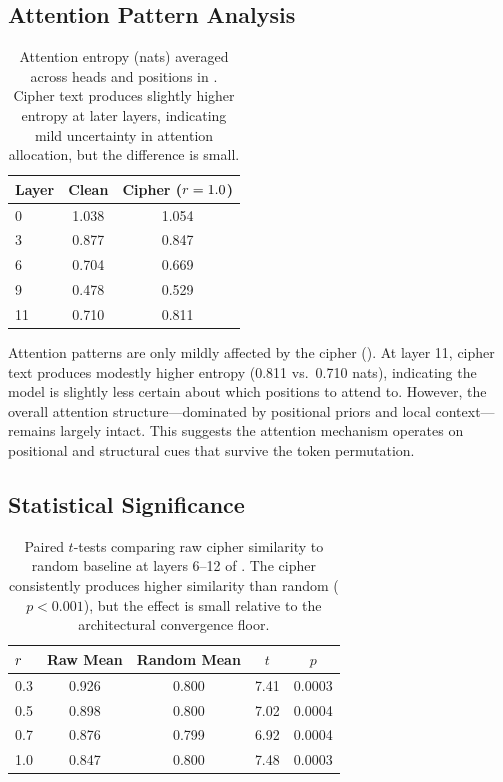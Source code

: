 \subsection{Attention Pattern Analysis}
\label{sec:attention}

\begin{table}[t]
    \centering
    \caption{Attention entropy (nats) averaged across heads and positions in \gpttwo. Cipher text produces slightly higher entropy at later layers, indicating mild uncertainty in attention allocation, but the difference is small.}
    \label{tab:attention}
    \begin{tabular}{@{}lcc@{}}
        \toprule
        Layer & Clean & Cipher ($r = 1.0$) \\
        \midrule
        0  & 1.038 & 1.054 \\
        3  & 0.877 & 0.847 \\
        6  & 0.704 & 0.669 \\
        9  & 0.478 & 0.529 \\
        11 & 0.710 & 0.811 \\
        \bottomrule
    \end{tabular}
\end{table}

Attention patterns are only mildly affected by the cipher (). At layer 11, cipher text produces modestly higher entropy (0.811 vs.\ 0.710 nats), indicating the model is slightly less certain about which positions to attend to. However, the overall attention structure---dominated by positional priors and local context---remains largely intact. This suggests the attention mechanism operates on positional and structural cues that survive the token permutation.

\subsection{Statistical Significance}
\label{sec:stats}

\begin{table}[t]
    \centering
    \caption{Paired $t$-tests comparing raw cipher similarity to random baseline at layers 6--12 of \gpttwo. The cipher consistently produces higher similarity than random ($p < 0.001$), but the effect is small relative to the architectural convergence floor.}
    \label{tab:stats}
    \begin{tabular}{@{}lcccc@{}}
        \toprule
        $r$ & Raw Mean & Random Mean & $t$ & $p$ \\
        \midrule
        0.3 & 0.926 & 0.800 & 7.41 & 0.0003 \\
        0.5 & 0.898 & 0.800 & 7.02 & 0.0004 \\
        0.7 & 0.876 & 0.799 & 6.92 & 0.0004 \\
        1.0 & 0.847 & 0.800 & 7.48 & 0.0003 \\
        \bottomrule
    \end{tabular}
\end{table}

